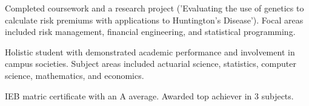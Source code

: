 \documentclass[10pt,a4paper,ragged2e,withhyper]{altacv}
\begin{document}
\begin{paracol}{2}
	    \medskip 

        
	    \smallskip
	    Completed coursework and a research project ('Evaluating the use of genetics to\\ calculate risk premiums with applications to Huntington's Disease'). Focal areas\\ included risk management, financial engineering, and statistical programming.

            \medskip
	    Holistic student with demonstrated academic performance and involvement in\\ campus societies. Subject areas included actuarial science, statistics, computer\\ science, mathematics, and economics.

            \medskip
	      IEB matric certificate with an A average. Awarded top achiever in 3 subjects.

        

    \end{paracol}
\end{document}

